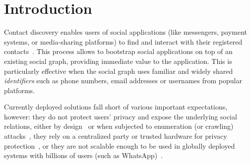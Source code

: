 \section{Introduction} \label{sec:introduction}

Contact discovery enables users of social applications (like messengers,
payment systems, or media-sharing platforms) to find and interact with their
registered contacts~\cite{marlinspike14contactdiscovery}. 
This process allows to bootstrap social applications on top of an existing
social graph, providing immediate value to the application. 
This is particularly effective when the social graph uses familiar and widely
shared {\em identifiers} such as phone numbers, email addresses or usernames
from popular platforms.

Currently deployed solutions fall short of various important expectations,
however: they do not protect users' privacy and expose the underlying
social relations, either by design~\cite{telegrampolicy, whatsapppolicy} or when
subjected to enumeration (or crawling)
attacks~\cite{hagen20discoveryabuse,mozilla21scraping}, they rely on a
centralized party or trusted hardware for privacy
protection~\cite{marlinspike2017technology}, or
they are not scalable enough to be used in globally deployed systems with
billions of users (such as WhatsApp)~\cite{kales2019mobile}.

%

